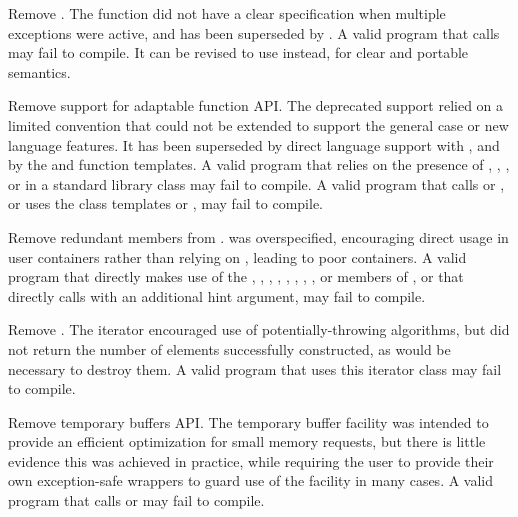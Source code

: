 \nodiffref
\change
Remove .
\rationale
The function did not have a clear specification when multiple exceptions were
active, and has been superseded by .
\effect
A valid \CppXVII{} program that calls  may fail
to compile. It can be revised to use  instead,
for clear and portable semantics.

\nodiffref
\change
Remove support for adaptable function API.
\rationale
The deprecated support relied on a limited convention that could not be
extended to support the general case or new language features. It has been
superseded by direct language support with , and by the
 and  function templates.
\effect
A valid \CppXVII{} program that relies on the presence of ,
, , or
 in a standard library class may fail to compile. A
valid \CppXVII{} program that calls  or , or uses the
class templates  or , may fail to
compile.

\nodiffref
\change
Remove redundant members from .
\rationale
{} was overspecified, encouraging direct usage in user containers
rather than relying on , leading to poor containers.
\effect
A valid \CppXVII{} program that directly makes use of the ,
, , ,
, , , , or
 members of , or that directly calls
 with an additional hint argument, may fail to compile.

\nodiffref
\change
Remove .
\rationale
The iterator encouraged use of potentially-throwing algorithms, but did
not return the number of elements successfully constructed,
as would be necessary to destroy them.
\effect
A valid \CppXVII{} program that uses this iterator class may fail to compile.

\nodiffref
\change
Remove temporary buffers API.
\rationale
The temporary buffer facility was intended to provide an efficient optimization
for small memory requests, but there is little evidence this was achieved in
practice, while requiring the user to provide their own exception-safe wrappers
to guard use of the facility in many cases.
\effect
A valid \CppXVII{} program that calls  or
 may fail to compile.

